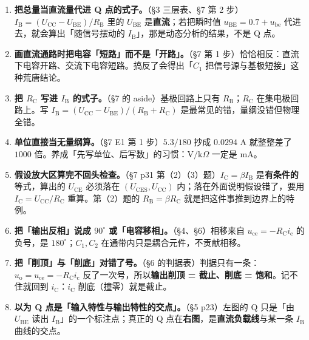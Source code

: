 \documentclass[11pt]{ctexart}
\newcommand{\UCC}{U_{\mathrm{CC}}}
\newcommand{\UBE}{U_{\mathrm{BE}}}
\newcommand{\UCE}{U_{\mathrm{CE}}}
\newcommand{\UCES}{U_{\mathrm{CES}}}
\newcommand{\RB}{R_{\mathrm{B}}}
\newcommand{\RC}{R_{\mathrm{C}}}
\newcommand{\IB}{I_{\mathrm{B}}}
\newcommand{\IC}{I_{\mathrm{C}}}
\let\dsHdrOrig\hdr
\renewcommand{\hdr}[2]{\dsHdrOrig{#1}{#2}\nopagebreak[4]}
\begin{document}
\begin{enumerate}

\item \textbf{把总量当直流量代进 Q 点的式子。}（§3 三层表、§7 第 2 步）$\IB=(\UCC-\UBE)/\RB$ 里的 $\UBE$ 是\textbf{直流}；若把瞬时值 $u_{\mathrm{BE}}=0.7+u_{\mathrm{be}}$ 代进去，就会算出「随信号摆动的 $\IB$」，那是动态分析的结果，不是 Q 点。

\item \textbf{画直流通路时把电容「短路」而不是「开路」。}（§7 第 1 步）恰恰相反：直流下电容开路、交流下电容短路。搞反了会得出「$C_1$ 把信号源与基极短接」这种荒唐结论。

\item \textbf{把 $\RC$ 写进 $\IB$ 的式子。}（§7 的 aside）基极回路上只有 $\RB$；$\RC$ 在集电极回路上。写 $\IB=(\UCC-\UBE)/(\RB+\RC)$ 是最常见的错，量纲没错但物理全错。

\item \textbf{单位直接当无量纲算。}（§7 E1 第 1 步）$5.3/180$ 抄成 $0.0294$ A 就整整差了 $1000$ 倍。养成「先写单位、后写数」的习惯：$\mathrm{V}/\mathrm{k}\Omega$ 一定是 mA。

\item \textbf{假设放大区算完不回头检查。}（§7 p31 第（2）（3）题）$\IC=\beta\IB$ 是\textbf{有条件的}等式，算出的 $\UCE$ 必须落在 $(\UCES,\UCC)$ 内；落在外面说明假设错了，要用 $\IC=\UCC/\RC$ 重算。第（2）题的 $\RB=\beta\RC$ 就是把这件事推到边界上的特例。

\item \textbf{把「输出反相」说成 $90^{\circ}$ 或「电容移相」。}（§4、§6）相移来自 $u_{\mathrm{ce}}=-\RC i_{\mathrm{c}}$ 的负号，是 $180^{\circ}$；$C_1,C_2$ 在通带内只是耦合元件，不贡献相移。

\item \textbf{把「削顶」与「削底」对错了号。}（§6 的判据表）判据只有一条：$u_{\mathrm{o}}=u_{\mathrm{ce}}=-\RC i_{\mathrm{c}}$ 反了一次号，所以\textbf{输出削顶 = 截止、削底 = 饱和}。记不住就回到 $i_{\mathrm{C}}$：$i_{\mathrm{C}}$ 削底（撞零）就是截止。

\item \textbf{以为 Q 点是「输入特性与输出特性的交点」。}（§5 p23）左图的 Q 只是「由 $\UBE$ 读出 $\IB$」的一个标注点；真正的 Q 点在\textbf{右图}，是\textbf{直流负载线}与某一条 $I_{\mathrm{B}}$ 曲线的交点。
\end{enumerate}

\end{document}
